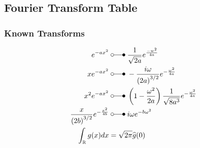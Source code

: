 \subsection{Fourier Transform Table}
\subsubsection{Known Transforms}\label{known_transforms}
\begin{align*}
    e^{-ax^2}                                & \;\laplace\; \frac1{\sqrt{2a}}e^{\frac{-w^2}{4a}}                                               \\
    xe^{-ax^2}                               & \;\laplace\; -\frac{i\omega}{{(2a)}^{3/2}}e^{-\frac{\omega^2}{4a}}                               \\
    x^2e^{-ax^2}                             & \;\laplace\; \left( 1-\frac{\omega^2}{2a} \right) \frac{1}{\sqrt{8a^3}}e^{-\frac{\omega^2}{4a}} \\
    \frac x{{(2b)}^{3/2}}e^{-\frac{x^2}{4b}} & \;\laplace\; i\omega e^{-b\omega^2}                                                             \\
    \int_{\mathbb{R}}g(x)dx                  & = \sqrt{2\pi}\widehat{g}(0)
\end{align*}


